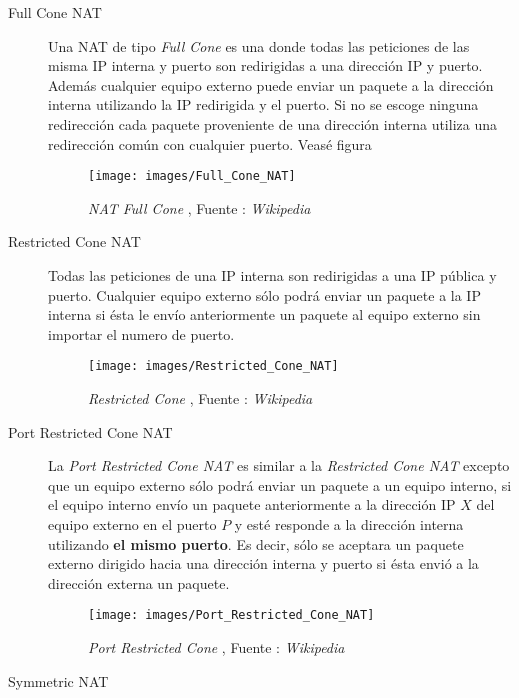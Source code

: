 \begin{description}
\item[Full Cone NAT] 

Una NAT de tipo \emph{Full Cone} es una donde todas las peticiones de las misma IP interna y puerto son redirigidas a una dirección IP y puerto. Además cualquier equipo externo puede enviar un paquete a la dirección interna utilizando la IP redirigida y el puerto. Si no se escoge ninguna redirección cada paquete proveniente de una dirección interna utiliza una redirección común con cualquier puerto. Veasé figura 

\begin{figure}[!h]
  \centering
  \texttt{[image: images/Full\_Cone\_NAT]}
  \caption{\emph{NAT Full Cone} , Fuente : \emph{Wikipedia}}
\label{fig:fnat}
\end{figure}

\item[Restricted Cone NAT] 

Todas las peticiones de una IP interna son redirigidas a una IP pública y puerto. Cualquier equipo externo sólo podrá enviar un paquete a la IP interna si ésta le envío anteriormente un paquete al equipo externo sin importar el numero de puerto. 

\begin{figure}[!h]
  \centering
  \texttt{[image: images/Restricted\_Cone\_NAT]}
  \caption{\emph{Restricted Cone} , Fuente : \emph{Wikipedia}}
  \label{fig:rnat}
\end{figure}


\item[Port Restricted Cone NAT] 

La \emph{Port Restricted Cone NAT} es similar a la \emph{Restricted Cone NAT} excepto que un equipo externo sólo podrá enviar un paquete a un equipo interno, si el equipo interno envío un paquete anteriormente a la dirección IP $X$ del equipo externo en el puerto $P$ y esté responde a la dirección interna utilizando \textbf{el mismo puerto}. Es decir, sólo se aceptara un paquete externo dirigido hacia una dirección interna y puerto si ésta envió a la dirección externa un paquete.


\begin{figure}[!h]
  \centering
  \texttt{[image: images/Port\_Restricted\_Cone\_NAT]}
  \caption{\emph{Port Restricted Cone} , Fuente : \emph{Wikipedia}}
  \label{fig:rpnat}
\end{figure}

\item[Symmetric NAT] 
\end{description}


